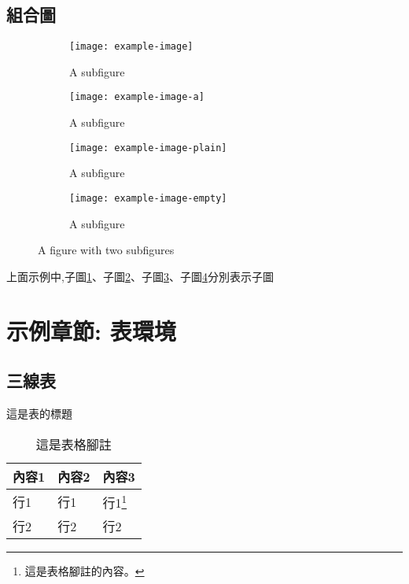 \documentclass[
    writingLanguage=chinese, %
    addPageTitle=on,  %
    addDeclaration=on, %
    addMUSTlog=off, %
    addFigTOC=on, %
    addTabTOC=on, %
    refIndent=off, %
    printMod=off, %
]{.def/must}
\begin{document}
\section{組合圖}
\begin{figure}[H]
	\centering
	\begin{subfigure}{0.49\textwidth}
	  	\centering
            \texttt{[image: example-image]}
		\caption{A subfigure}
		\label{fig:sub1}
	\end{subfigure}
	\hfill
	\begin{subfigure}{.49\textwidth}
		\centering
            \texttt{[image: example-image-a]}
		\caption{A subfigure}
	  	\label{fig:sub2}
	\end{subfigure}
        \newline
	\begin{subfigure}{.49\textwidth}
		\centering
            \texttt{[image: example-image-plain]}
		\caption{A subfigure}
		\label{fig:sub3}
	\end{subfigure}
	\begin{subfigure}{.49\textwidth}
		\centering
            \texttt{[image: example-image-empty]}
		\caption{A subfigure}
		\label{fig:sub4}
	\end{subfigure}
	\caption{A figure with two subfigures}
	\label{fig:sub}
\end{figure}
上面示例中,子圖\ref{fig:sub1}、子圖\ref{fig:sub2}、子圖\ref{fig:sub3}、子圖\ref{fig:sub4}分別表示子圖



















\chapter{示例章節: 表環境}
\section{三線表}
\begin{table}[H]
\caption{這是表的標題}
\centering
\begin{tabularx}{\textwidth}{XXX} %
\toprule
內容1 & 內容2 & 內容3 \\
\midrule
行1 & 行1 & 行1\footnote{這是表格腳註的內容。} \\
行2 & 行2 & 行2 \\
\bottomrule
\end{tabularx}
\caption*{這是表格腳註}
\end{table}
\end{document}
